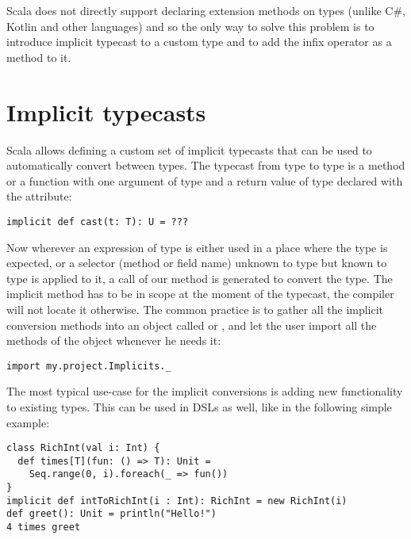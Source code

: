 Scala does not directly support declaring extension methods on types (unlike C\#, Kotlin and other languages) and so the only way to solve this problem is to introduce implicit typecast to a custom type and to add the infix operator as a method to it.

\section{Implicit typecasts}

Scala allows defining a custom set of implicit typecasts that can be used to automatically convert between types. The typecast from type  to type  is a method or a function with one argument of type  and a return value of type  declared with the  attribute:

\lstset{style=Scala}
\begin{lstlisting}
implicit def cast(t: T): U = ???
\end{lstlisting}

Now wherever an expression of type  is either used in a place where the type  is expected, or a selector (method or field name) unknown to type  but known to type  is applied to it, a call of our  method is generated to convert the type. The implicit method has to be in scope at the moment of the typecast, the compiler will not locate it otherwise. The common practice is to gather all the implicit conversion methods into an object called  or , and let the user import all the methods of the object whenever he needs it:

\lstset{style=Scala}
\begin{lstlisting}
import my.project.Implicits._
\end{lstlisting}

The most typical use-case for the implicit conversions is adding new functionality to existing types. This can be used in DSLs as well, like in the following simple example:

\lstset{style=Scala}
\begin{lstlisting}
class RichInt(val i: Int) {
  def times[T](fun: () => T): Unit =
    Seq.range(0, i).foreach(_ => fun())
}
implicit def intToRichInt(i : Int): RichInt = new RichInt(i)
def greet(): Unit = println("Hello!")
4 times greet
\end{lstlisting}


